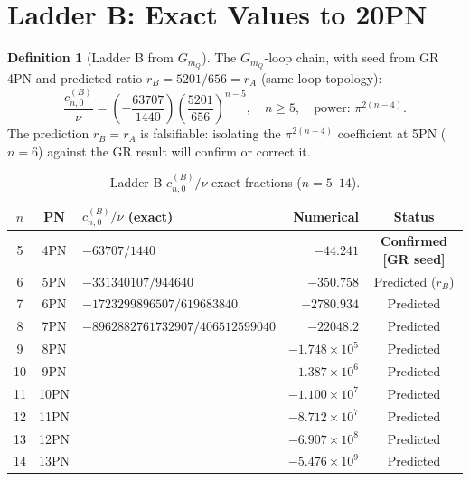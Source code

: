 \documentclass[11pt,a4paper]{article}
\theoremstyle{plain}
\theoremstyle{definition}
\newtheorem{definition}[theorem]{Definition}
\theoremstyle{remark}
\newcommand{\mQ}{m_Q}
\newcommand{\cB}{c^{(B)}}
\begin{document}
\section{Ladder B: Exact Values to 20PN}
\label{sec:ladderB}

\begin{definition}[Ladder B from $G_{\mQ}$]\label{def:LB}
The $G_{\mQ}$-loop chain, with seed from GR 4PN and predicted ratio
$r_B = 5201/656 = r_A$ (same loop topology):
\begin{equation}
  \frac{\cB_{n,0}}{\nu} = \left(-\frac{63707}{1440}\right)
    \left(\frac{5201}{656}\right)^{\!n-5}, \quad n\geq5,
    \quad \text{power: }\pi^{2(n-4)}.
  \label{eq:LB}
\end{equation}
The prediction $r_B = r_A$ is falsifiable: isolating the $\pi^{2(n-4)}$
coefficient at 5PN ($n=6$) against the GR result will confirm or correct it.
\end{definition}

\begin{table}[h]
\centering\small
\renewcommand{\arraystretch}{1.25}
\caption{Ladder B $\cB_{n,0}/\nu$ exact fractions ($n=5$--$14$).}
\label{tab:LB}
\begin{tabular}{@{}cclrc@{}}
\toprule
$n$ & PN & $\cB_{n,0}/\nu$ (exact) & Numerical & Status \\
\midrule
5 & 4PN & $-63707/1440$ & $-44.241$ & \textcolor{confirmed}{\textbf{Confirmed [GR seed]}} \\
\rowcolor{lightgray}
6 & 5PN & $-331340107/944640$ & $-350.758$ & \textcolor{predicted}{Predicted ($r_B$)} \\
7 & 6PN & $-1723299896507/619683840$ & $-2780.934$ & \textcolor{predicted}{Predicted} \\
\rowcolor{lightgray}
8 & 7PN & $-8962882761732907/406512599040$ & $-22048.2$ & \textcolor{predicted}{Predicted} \\
9 & 8PN & & $-1.748\times10^5$ & \textcolor{predicted}{Predicted} \\
\rowcolor{lightgray}
10 & 9PN & & $-1.387\times10^6$ & \textcolor{predicted}{Predicted} \\
11 & 10PN & & $-1.100\times10^7$ & \textcolor{predicted}{Predicted} \\
\rowcolor{lightgray}
12 & 11PN & & $-8.712\times10^7$ & \textcolor{predicted}{Predicted} \\
13 & 12PN & & $-6.907\times10^8$ & \textcolor{predicted}{Predicted} \\
\rowcolor{lightgray}
14 & 13PN & & $-5.476\times10^9$ & \textcolor{predicted}{Predicted} \\
\bottomrule
\end{tabular}
\end{table}
\end{document}
